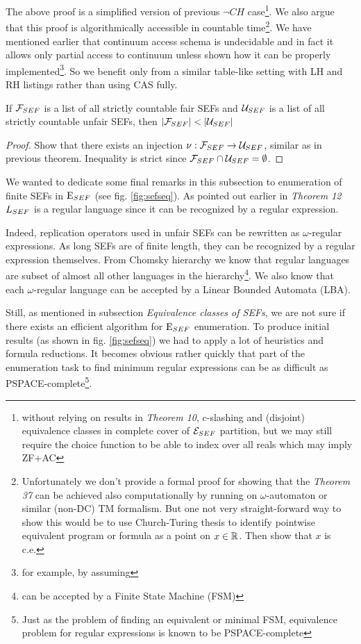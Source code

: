 The above proof is a simplified version of previous $\neg CH$ case\footnote{without relying on results in \textit{Theorem 10}, c-slashing and (disjoint) equivalence classes in complete cover of $\mathcal{E}_{SEF}$ partition, but we may still require the choice function to be able to index over all reals which may imply ZF+AC\cite{jech2003set}}. We also argue that this proof is algorithmically accessible in countable time\footnote{Unfortunately we don't provide a formal proof for showing that the \textit{Theorem 37} can be achieved also computationally by running on $\omega$-automaton or similar (non-DC) TM formalism. But one not very straight-forward way to show this would be to use Church-Turing thesis to identify pointwise equivalent program or formula as a point on $x \in \mathbb{R}$. Then show that $x$ is c.e.}. We have mentioned earlier that continuum access schema is undecidable and in fact it allows only partial access to continuum unless shown how it can be properly implemented\footnote{for example, by assuming }. So we benefit only from a similar table-like setting with LH and RH listings rather than using CAS fully.

\begin{corollary}
  If $\mathcal{F}_{SEF}$ is a list of all strictly countable fair SEFs and $\mathcal{U}_{SEF}$ is a list of all strictly countable unfair SEFs, then $|\mathcal{F}_{SEF}| < |\mathcal{U}_{SEF}|$
\end{corollary}
\begin{proof}
  Show that there exists an injection $\nu: \mathcal{F}_{SEF} \to \mathcal{U}_{SEF}$, similar as in previous theorem. Inequality is strict since $\mathcal{F}_{SEF} \cap \mathcal{U}_{SEF} = \emptyset$.
\end{proof}

We wanted to dedicate some final remarks in this subsection to enumeration of finite SEFs in $\mathrm{E}_{SEF}$ (see fig. \ref{fig:sefseq}). As pointed out earlier in \textit{Theorem 12}  $L_{SEF}$ is a regular language since it can be recognized by a regular expression.

Indeed, replication operators used in unfair SEFs can be rewritten as $\omega$-regular expressions. As long SEFs are of finite length, they can be recognized by a regular expression themselves. From Chomsky hierarchy we know that regular languages are subset of almost all other languages in the hierarchy\footnote{can be accepted by a Finite State Machine (FSM)}. We also know that each $\omega$-regular language can be accepted by a Linear Bounded Automata (LBA).

Still, as mentioned in subsection \textit{Equivalence classes of SEFs}, we are not sure if there exists an efficient algorithm for $\mathrm{E}_{SEF}$ enumeration. To produce initial results (as shown in fig. \ref{fig:sefseq}) we had to apply a lot of heuristics and formula reductions. It becomes obvious rather quickly that part of the enumeration task to find minimum regular expressions can be as difficult as PSPACE-complete\footnote{Just as the problem of finding an equivalent or minimal FSM, equivalence problem for regular expressions is known to be PSPACE-complete\cite{Sipser05introcompther}}.

